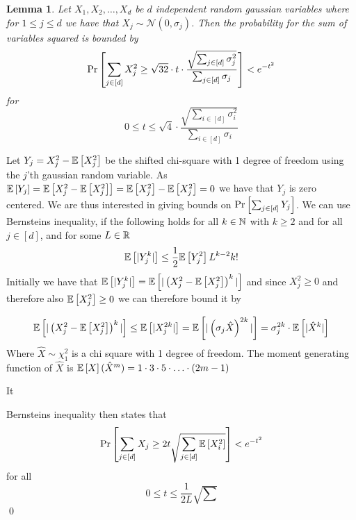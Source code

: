 \documentclass[a4paper,12pt]{article}
\renewenvironment{proof}{{\textit{Proof} \\}}{\qed}
\newtheorem{lemma}{Lemma}[section]
\begin{document}
\begin{lemma}
Let $X_1, X_2, \dots , X_d$ be $d$ independent random gaussian variables 
where for $ 1 \le j \le d$ we have that $X_j \sim \mathcal{N}(0, \sigma_j)$.
Then the probability for the sum of variables squared is bounded by
\[
    \Pr\left [\sum_{j \in [d]} X^2_j \ge \sqrt{32} \cdot t \cdot 
    \frac{\sqrt{\sum_{j \in [d]} \sigma_j^2}}{\sum_{j \in [d]} \sigma_j} \right] < e^{-t^2}
\]
for
\[
0 \le t \le 
\sqrt{4} \cdot \frac{\sqrt{\sum_{i \in [d]} \sigma_i^2}}{\sum_{i \in [d]} \sigma_i}
\]
\end{lemma}
\begin{proof}
Let $Y_j = X_j^2 - \mathbb{E} \left [ X_j^2  \right]$ be the shifted chi-square with 1 degree of freedom
using the $j$'th gaussian random variable.
As $\mathbb{E} \left [ Y_j  \right] = \mathbb{E} \left [ X_j^2 - \mathbb{E} \left [ X_j^2  \right]  \right] = \mathbb{E} \left [ X_j^2  \right] - \mathbb{E} \left [ X_j^2  \right] = 0$ 
we have that $Y_j$ is zero centered. We are thus interested in giving bounds on
$\Pr\left [\sum_{j \in [d]} Y_j \right]$. 
We can use Bernsteins inequality, if the following holds for all $k \in \mathbb{N}$ with $k \ge 2$
 and for all $j \in [d]$, and for some $L \in \mathbb{R}$
\[
    \mathbb{E} \left [  |Y^k_j|   \right] \le \frac{1}{2} \mathbb{E} \left [ Y_j^2  \right] L^{k-2} k!
\]
Initially we have that $\mathbb{E} \left [  |Y_j^k|   \right] = \mathbb{E} \left [  |\left (X_j^2 - \mathbb{E} \left [ X_j^2  \right]\right)^k|  \right]$
and since $X_j^2 \ge 0$ and therefore also $\mathbb{E} \left [ X_j^2  \right] \ge 0$ 
we can therefore bound it by

\[
    \mathbb{E} \left [  |\left (X_j^2 - \mathbb{E} \left [ X_j^2  \right]\right)^k|  \right] \le \mathbb{E} \left [  | X_j^{2k} |   \right] =
    \mathbb{E} \left [  | \left (\sigma_j \hat{X}\right)^{2k} |   \right] = 
    \sigma_j^{2k} \cdot \mathbb{E} \left [  |\hat{X}^{k} |   \right]
\]
Where $\hat{X} \sim \chi^2_1$ is a chi square with 1 degree of freedom.
The moment generating function of $\hat{X}$ is $\mathbb{E} \left [ X  \right](\hat{X}^m) = 1 \cdot 3 \cdot 5 \cdot \ldots \cdot (2m - 1) $

\newpage
It 





Bernsteins inequality then states that
\[
    \Pr\left [\sum_{j \in [d]} X_j \ge 2 t \sqrt{ \sum_{j \in [d]} \mathbb{E} \left [ X_i^2  \right]} \right] < e^{-t^2}
\]
for all 
\[
    0 \le t \le \frac{1}{2L} \sqrt{\sum}
\]
\end{proof}
\end{document}

